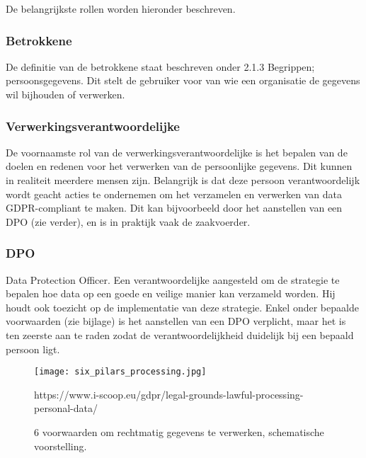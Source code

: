 De belangrijkste rollen worden hieronder beschreven. 

\subsubsection{Betrokkene}
De definitie van de betrokkene staat beschreven onder 2.1.3 Begrippen; persoonsgegevens. Dit stelt de gebruiker voor van wie een organisatie de gegevens wil bijhouden of verwerken. 

\subsubsection{Verwerkingsverantwoordelijke}
De voornaamste rol van de verwerkingsverantwoordelijke is het bepalen van de doelen en redenen voor het verwerken van de persoonlijke gegevens. Dit kunnen in realiteit meerdere mensen zijn. Belangrijk is dat deze persoon verantwoordelijk wordt geacht acties te ondernemen om het verzamelen en verwerken van data GDPR-compliant te maken. 
Dit kan bijvoorbeeld door het aanstellen van een DPO (zie verder), en is in praktijk vaak de zaakvoerder.  

\subsubsection{DPO}
Data Protection Officer. Een verantwoordelijke aangesteld om de strategie te bepalen hoe data op een goede en veilige manier kan verzameld worden. Hij houdt ook toezicht op de implementatie van deze strategie.
Enkel onder bepaalde voorwaarden (zie bijlage) is het aanstellen van een DPO verplicht, maar het is ten zeerste aan te raden zodat de verantwoordelijkheid duidelijk bij een bepaald persoon ligt. 

   \begin{figure}[h]
	\centering
	\texttt{[image: six\_pilars\_processing.jpg]}
	\caption{6 voorwaarden om rechtmatig gegevens te verwerken, schematische voorstelling.}
	https://www.i-scoop.eu/gdpr/legal-grounds-lawful-processing-personal-data/
\end{figure}

